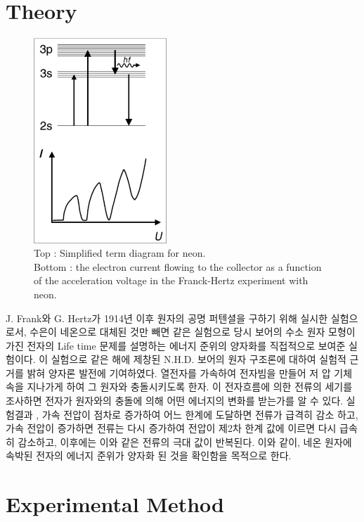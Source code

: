 \documentclass[a4paper, 10pt, nanum]{CSUniSchoolLabReport}
\begin{document}
\section{Theory}

	\begin{figure}[htb!]
		\centering
		\includegraphics[width=5cm]{fig1.png}
		\caption{Top : Simplified term diagram for neon.\\ Bottom : the electron current flowing to the collector as a function of the acceleration voltage in the Franck-Hertz	experiment with neon.}
		\label{fig:1}
	\end{figure}

  J. Frank와 G. Hertz가 1914년 이후 원자의 공명 퍼텐셜을 구하기 위해 실시한 실험으로서, 수은이 네온으로 대체된 것만 빼면 같은 실험으로 당시 보어의 수소 원자 모형이 가진 전자의 Life time 문제를 설명하는 에너지 준위의 양자화를 직접적으로 보여준 실험이다. 이 실험으로 같은 해에 제창된 N.H.D. 보어의 원자 구조론에 대하여 실험적 근거를 밝혀 양자론 발전에 기여하였다. 열전자를 가속하여 전자빔을 만들어 저
  압 기체 속을 지나가게 하여 그 원자와 충돌시키도록 한자. 이 전자흐름에 의한 전류의 세기를 조사하면 전자가 원자와의 충돌에 의해 어떤 에너지의 변화를 받는가를 알 수 있다. 실험결과 , 가속 전압이 점차로 증가하여 어느 한계에 도달하면 전류가 급격히 감소
  하고, 가속 전압이 증가하면 전류는 다시 증가하여 전압이 제2차 한계 값에 이르면 다시 급속히 감소하고, 이후에는 이와 같은 전류의 극대 값이 반복된다. 이와 같이, 네온 원자에 속박된 전자의 에너지 준위가 양자화 된 것을 확인함을 목적으로 한다.


\section{Experimental Method}
\end{document}
